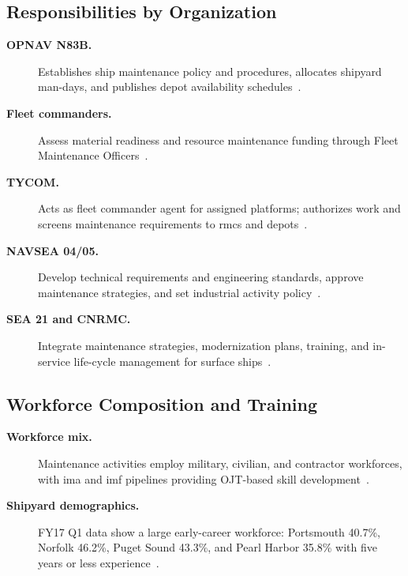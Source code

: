 \documentclass[../main.tex]{subfiles}
\begin{document}
\subsection{Responsibilities by Organization}
\begin{description}
  \item[\textbf{OPNAV N83B.}] Establishes ship maintenance policy and procedures, allocates shipyard man-days, and publishes depot availability schedules~\autocite{edo-4-1-1-fleet-maint-assets-2025}.
  \item[\textbf{Fleet commanders.}] Assess material readiness and resource maintenance funding through Fleet Maintenance Officers~\autocite{edo-4-1-1-fleet-maint-assets-2025}.
  \item[\textbf{TYCOM.}] Acts as fleet commander agent for assigned platforms; authorizes work and screens maintenance requirements to \acp{rmc} and depots~\autocite{edo-4-1-1-fleet-maint-assets-2025}.
  \item[\textbf{NAVSEA 04/05.}] Develop technical requirements and engineering standards, approve maintenance strategies, and set industrial activity policy~\autocite{edo-4-1-1-fleet-maint-assets-2025}.
  \item[\textbf{SEA 21 and CNRMC.}] Integrate maintenance strategies, modernization plans, training, and in-service life-cycle management for surface ships~\autocite{edo-4-1-1-fleet-maint-assets-2025}.
\end{description}

\subsection{Workforce Composition and Training}
\begin{description}
  \item[\textbf{Workforce mix.}] Maintenance activities employ military, civilian, and contractor workforces, with \ac{ima} and \ac{imf} pipelines providing OJT-based skill development~\autocite{edo-4-1-1-fleet-maint-assets-2025}.
  \item[\textbf{Shipyard demographics.}] FY17 Q1 data show a large early-career workforce: Portsmouth 40.7\%, Norfolk 46.2\%, Puget Sound 43.3\%, and Pearl Harbor 35.8\% with five years or less experience~\autocite{edo-4-1-1-fleet-maint-assets-2025}.
\end{description}
\end{document}
